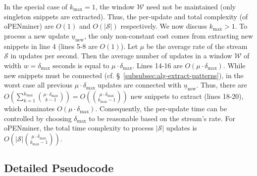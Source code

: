 \documentclass[sigconf]{acmart}
\newcommand{\ul}{\underline}
\newcommand{\methodOffline}{oPENminer\xspace}
\newcommand{\update}{\ul{u}}
\newcommand{\newUpdate}{\update_{\text{new}}}
\newcommand{\stream}{\mathscr{S}}
\newcommand{\patternSize}{k}
\newcommand{\duration}{\delta}
\newcommand{\window}{\mathscr{W}}
\newcommand{\windowWidth}{w}
\newcommand{\streamRate}{\mu}
\newcommand{\maxDuration}{\duration_{\max}}
\newcommand{\maxSize}{\patternSize_{\max}}
\newcommand{\order}{O}
\begin{document}
In the special case of $\maxSize = 1$, the window $\window$ need not be maintained (only singleton snippets are extracted). Thus, the per-update and total complexity (of \methodOffline) are $\order(1)$ and $\order(|\stream|)$ respectively. We now discuss $\maxSize > 1$. To process a new update $\newUpdate$, the only non-constant cost comes from extracting new snippets in line 4 (lines 5-8 are $\order(1)$). Let $\streamRate$ be the average rate of the stream $\stream$ in updates per second. Then the average number of updates in a window $\window$ of width $\windowWidth = \maxDuration$ seconds is equal to $\streamRate \cdot \maxDuration$. Lines 14-16 are $\order(\streamRate \cdot \maxDuration)$. While new snippets must be connected (cf. \S~\ref{subsubsec:alg-extract-patterns}), in the worst case all previous $\streamRate \cdot \maxDuration$ updates are connected with $\newUpdate$. Thus, there are $\order\left(\sum_{\patternSize = 1}^{\maxSize} { \streamRate \cdot \maxDuration \choose \patternSize - 1 } \right)= \order\left({ \streamRate \cdot \maxDuration \choose \maxSize - 1 }\right)$ new snippets to extract (lines 18-20), which dominates $\order(\streamRate \cdot \maxDuration)$. Consequently, the per-update time can be controlled by choosing $\maxDuration$ to be reasonable based on the stream's rate. For \methodOffline, the total time complexity to process $|\stream|$ updates is $\order(|\stream| { \streamRate \cdot \maxDuration \choose \maxSize - 1 })$. 


\subsection{Detailed Pseudocode}
\label{subsec:detailed-pseudocode}
\end{document}
